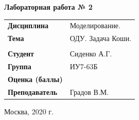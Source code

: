 \documentclass[a4paper,14pt]{extreport} %
\begin{document}
\begin{titlepage}
    \vspace{2cm}

    \begin{center}
        \textbf{Лабораторная работа № 2} \\
        \vspace{0.5cm}
    \end{center}

    \vspace{4cm}

    \begin{flushleft}
        \begin{tabular}{ll}
            \textbf{Дисциплина} & Моделирование.  \\
            \textbf{Тема} & ОДУ. Задача Коши.  \\
            \\
            \textbf{Студент} & Сиденко А.Г. \\
            \textbf{Группа} & ИУ7-63Б \\
            \textbf{Оценка (баллы)} & \\
            \textbf{Преподаватель} & Градов В.М.   \\
        \end{tabular}
    \end{flushleft}

    \vspace{4cm}

   \begin{center}
        Москва, 2020 г.
    \end{center}

\end{titlepage}
\end{document}
